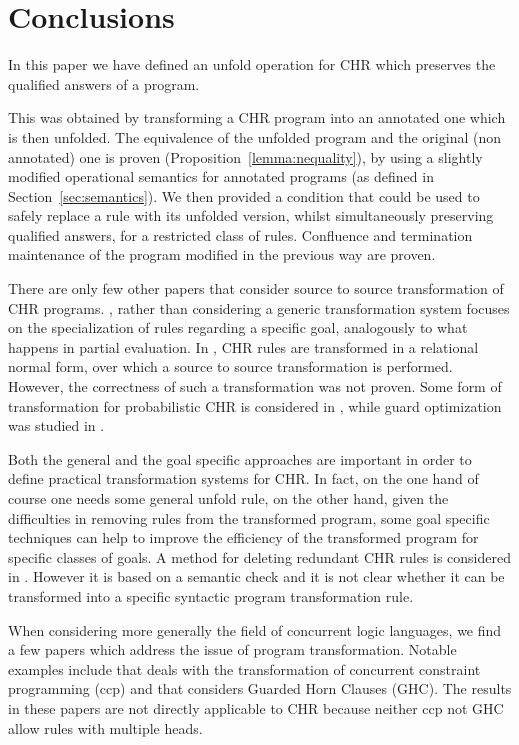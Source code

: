 \documentclass[final]{acmtrans2e}
\begin{document}
\section{Conclusions}\label{sec:conclusion_and_future}

In this paper we have defined an unfold operation for CHR which preserves the qualified answers of a program.

This was obtained by transforming a CHR program into an
annotated one which is then unfolded. The equivalence of the unfolded
program and the original (non annotated) one is proven (Proposition~\ref{lemma:nequality}),
by using  a slightly modified operational
semantics for annotated programs (as defined in Section~\ref{sec:semantics}).
We then provided a condition that could be used to safely replace a
rule with its unfolded version, whilst simultaneously preserving qualified answers, for a
restricted class of rules. Confluence and termination maintenance of
the program modified in the previous way are proven.

There are only few other papers that consider source to source transformation
of CHR programs. \cite{Fru04}, rather than considering a generic transformation
system focuses on the specialization of rules regarding a specific goal, analogously
to what happens in partial evaluation. In \cite{FH03}, CHR rules are transformed
in a relational normal form, over which a source to source transformation is performed.
However, the correctness of such a transformation was not proven. Some form of
transformation for probabilistic CHR is considered in \cite{FDPW02}, while
guard optimization was studied in \cite{SSD05b}.

Both the general and the goal specific approaches are important in order
to define practical transformation systems for CHR. In fact, on the
one hand of course one needs some general unfold rule, on the other
hand, given the difficulties in removing rules from the transformed
program, some goal specific techniques can help to improve the
efficiency of the transformed program for specific classes of
goals. A method for deleting redundant CHR rules is considered
in \cite{AF04}. However it is based on a semantic check and it
is not clear whether it can be transformed into a specific syntactic
program transformation rule.

When considering more generally the field of concurrent logic
languages, we find a few papers which address the issue of program
transformation. Notable examples include  \cite{EGM01} that deals with
the transformation of  concurrent constraint programming (ccp) and
\cite{UF88} that considers Guarded Horn Clauses (GHC).  The
results in these papers are not directly applicable to CHR  because
neither ccp not GHC allow rules with  multiple heads.
\end{document}
